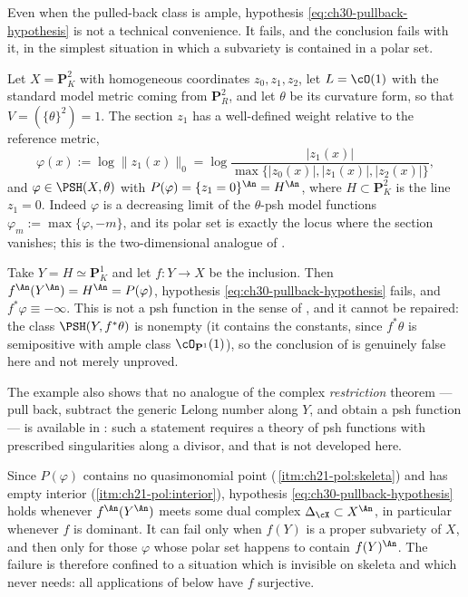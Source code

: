 Even when the pulled-back class is ample, hypothesis
\eqref{eq:ch30-pullback-hypothesis} is not a technical convenience.  It
fails, and the conclusion fails with it, in the simplest situation in
which a subvariety is contained in a polar set.

\begin{example}
\label{ex:ch30-polar-pullback-fails}
Let \(X=\mathbf P^2_K\) with homogeneous coordinates \(z_0,z_1,z_2\), let
\(L=\cO(1)\) with the standard model metric coming from
\(\mathbf P^2_R\), and let \(\theta\) be its curvature form, so that
\(V=(\{\theta\}^2)=1\).  The section \(z_1\) has a well-defined weight
relative to the reference metric,
\[
        \varphi(x):=\log\lVert z_1(x)\rVert_0
        =\log\frac{|z_1(x)|}
        {\max\{|z_0(x)|,|z_1(x)|,|z_2(x)|\}},
\]
and \(\varphi\in\PSH(X,\theta)\) with
\(P(\varphi)=\{z_1=0\}^{\An}=H^{\An}\), where \(H\subset\mathbf P^2_K\) is
the line \(z_1=0\).  Indeed \(\varphi\) is a decreasing limit of the
\(\theta\)-psh model functions
\(\varphi_m:=\max\{\varphi,-m\}\), and its polar set is exactly the locus
where the section vanishes; this is the two-dimensional analogue of
.

Take \(Y=H\simeq\mathbf P^1_K\) and let \(f:Y\to X\) be the inclusion.  Then
\(f^{\An}(Y^{\An})=H^{\An}=P(\varphi)\), hypothesis
\eqref{eq:ch30-pullback-hypothesis} fails, and
\(f^*\varphi\equiv-\infty\).  This is not a psh function in the sense of
, and it cannot be repaired: the class
\(\PSH(Y,f^*\theta)\) is nonempty (it contains the constants, since
\(f^*\theta\) is semipositive with ample class \(\cO_{\mathbf P^1}(1)\)),
so the conclusion of  is genuinely false here
and not merely unproved.

The example also shows that no analogue of the complex \emph{restriction}
theorem --- pull back, subtract the generic Lelong number along \(Y\), and
obtain a psh function --- is available in : such a statement
requires a theory of psh functions with prescribed singularities along a
divisor, and that is not developed here.
\end{example}

\begin{remark}
\label{rem:ch30-admissible-images}
Since \(P(\varphi)\) contains no quasimonomial point
(\,\cref{itm:ch21-pol:skeleta}) and has empty
interior (\cref{itm:ch21-pol:interior}), hypothesis
\eqref{eq:ch30-pullback-hypothesis} holds whenever \(f^{\An}(Y^{\An})\)
meets some dual complex \(\Delta_{\cX}\subset X^{\An}\), in particular
whenever \(f\) is dominant.  It can fail only when \(f(Y)\) is a proper
subvariety of \(X\), and then only for those \(\varphi\) whose polar set
happens to contain \(f(Y)^{\An}\).  The failure is therefore confined to a
situation which is invisible on skeleta and which
 never needs: all applications of
 below have \(f\) surjective.
\end{remark}

